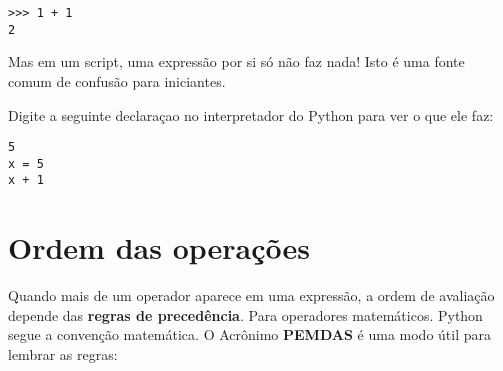 \beforeverb
\begin{verbatim}
>>> 1 + 1
2
\end{verbatim}
\afterverb
%

Mas em um script, uma expressão por si só não 
faz nada! Isto é uma fonte comum 
de confusão para iniciantes.

%                                                                                                       
\begin{ex}
Digite a seguinte declaraçao no interpretador do Python para ver 
o que ele faz:
\beforeverb
\begin{verbatim}
5
x = 5
x + 1
\end{verbatim}
\afterverb
%
\end{ex}


\section{Ordem das operações}


Quando mais de um operador aparece em uma expressão, a ordem de 
avaliação depende das {\bf regras de precedência}. Para 
operadores matemáticos. Python segue a convenção matemática.
O Acrônimo {\bf PEMDAS} é uma modo útil para lembrar as regras:


